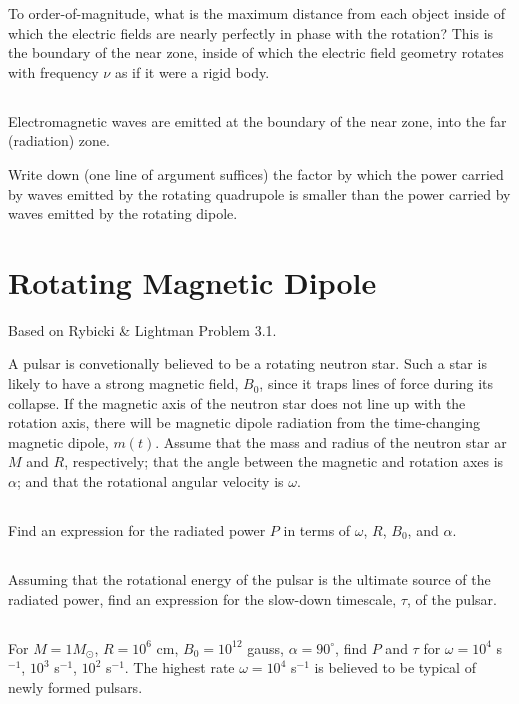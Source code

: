 \documentclass[11pt]{article}
\begin{document}
To order-of-magnitude, what is the maximum distance from each object inside of
which the electric fields are nearly perfectly in phase with the rotation?
This is the boundary of the near zone, inside of which the electric field
geometry rotates with frequency $\nu$ as if it were a rigid body.

\subsection{}
Electromagnetic waves are emitted at the boundary of the near zone, into
the far (radiation) zone.

Write down (one line of argument suffices) the factor by which the power
carried by waves emitted by the rotating quadrupole is smaller than the power
carried by waves emitted by the rotating dipole.

\section{Rotating Magnetic Dipole}

Based on Rybicki \& Lightman Problem 3.1.

A pulsar is convetionally believed to be a rotating neutron star.  Such
a star is likely to have a strong magnetic field, $B_0$, since it traps
lines of force during its collapse.  If the magnetic axis of the neutron
star does not line up with the rotation axis, there will be magnetic dipole
radiation from the time-changing magnetic dipole, $m(t)$.  Assume that the mass
and radius of the neutron star ar $M$ and $R$, respectively; that the angle
between the magnetic and rotation axes is $\alpha$; and that the rotational
angular velocity is $\omega$.

\subsection{}
Find an expression for the radiated power $P$ in terms of $\omega$,
$R$, $B_0$, and $\alpha$.

\subsection{}
Assuming that the rotational energy of the pulsar is the ultimate source
of the radiated power, find an expression for the slow-down timescale,
$\tau$, of the pulsar.

\subsection{}
For $M=1 M_\odot$, $R=10^6$ cm, $B_0=10^{12}$ gauss, $\alpha=90^\circ$,
find $P$ and $\tau$ for $\omega=10^4$ s$^{-1}$, $10^3$ s$^{-1}$,
$10^2$ s$^{-1}$.  The highest rate $\omega=10^4$ s$^{-1}$ is believed
to be typical of newly formed pulsars.
\end{document}
